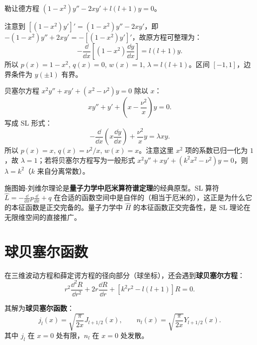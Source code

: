 \begin{example}[将勒让德方程化为 SL 形式]
勒让德方程 $(1-x^2)y'' - 2xy' + l(l+1)y = 0$。

注意到 $[(1-x^2)y']' = (1-x^2)y'' - 2xy'$，即 $-(1-x^2)y'' + 2xy' = -[(1-x^2)y']'$，故原方程可整理为：
\begin{equation}
-\frac{\dd}{\dd x}\left[(1-x^2)\frac{\dd y}{\dd x}\right] = l(l+1)y.
\end{equation}
所以 $p(x)=1-x^2$, $q(x)=0$, $w(x)=1$, $\lambda = l(l+1)$。区间 $[-1,1]$，边界条件为 $y(\pm1)$ 有界。
\end{example}

\begin{example}[将贝塞尔方程化为 SL 形式]
贝塞尔方程 $x^2 y'' + xy' + (x^2 - \nu^2)y = 0$ 除以 $x$：
\begin{equation}
xy'' + y' + \left(x - \frac{\nu^2}{x}\right)y = 0.
\end{equation}
写成 SL 形式：
\begin{equation}
-\frac{\dd}{\dd x}\left(x\frac{\dd y}{\dd x}\right) + \frac{\nu^2}{x}y = \lambda x y.
\end{equation}
所以 $p(x)=x$, $q(x)=\nu^2/x$, $w(x)=x$。注意这里 $x^2$ 项的系数已归一化为 $1$，故 $\lambda = 1$；若将贝塞尔方程写为一般形式 $x^2y''+xy'+(k^2x^2-\nu^2)y=0$，则 $\lambda=k^2$（$k$ 来自分离常数）。
\end{example}

\begin{insight}
施图姆-刘维尔理论是\textbf{量子力学中厄米算符谱定理}的经典原型。SL 算符 $\hat{L} = -\frac{\dd}{\dd x}p\frac{\dd}{\dd x}+q$ 在合适的函数空间中是自伴的（相当于厄米的），这正是为什么它的本征函数是正交完备的。量子力学中 $\hat{H}$ 的本征函数正交完备性，是 SL 理论在无限维空间的直接推广。
\end{insight}

\section{球贝塞尔函数}
\label{sec:spherical_bessel}

在三维波动方程和薛定谔方程的径向部分（球坐标），还会遇到\textbf{球贝塞尔方程}：
\begin{equation}
r^2\frac{\dd^2 R}{\dd r^2} + 2r\frac{\dd R}{\dd r}
+ [k^2 r^2 - l(l+1)]R = 0.
\label{eq:spherical_bessel_ode}
\end{equation}

其解为\textbf{球贝塞尔函数}：
\begin{equation}
j_l(x) = \sqrt{\frac{\pi}{2x}}J_{l+1/2}(x),\qquad
n_l(x) = \sqrt{\frac{\pi}{2x}}Y_{l+1/2}(x).
\label{eq:spherical_bessel}
\end{equation}
其中 $j_l$ 在 $x=0$ 处有限，$n_l$ 在 $x=0$ 处发散。

